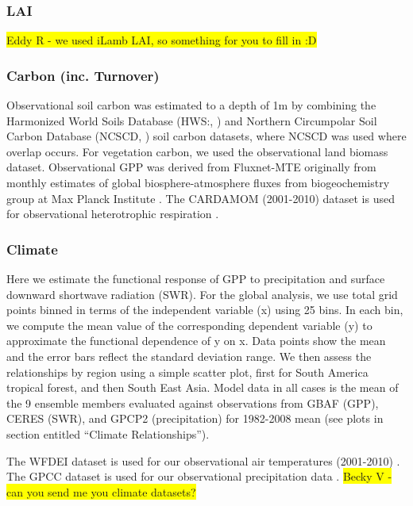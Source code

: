 \documentclass[bg, manuscript]{copernicus}
\newcommand{\hilight}[1]{\colorbox{yellow}{#1}}
\begin{document}
\subsubsection{LAI}
\hilight{Eddy R - we used iLamb LAI, so something for you to fill in :D}

\subsubsection{Carbon (inc. Turnover)}
Observational soil carbon was estimated to a depth of 1m by combining the Harmonized World Soils Database (HWS:, \cite{nachtergaele2012harmonized}) and Northern Circumpolar Soil Carbon Database (NCSCD, \cite{hugelius2013northern}) soil carbon datasets, where NCSCD was used where overlap occurs. For vegetation carbon, we used the \citep{avitabile2016integrated} observational land biomass dataset. Observational GPP was derived from Fluxnet-MTE originally from monthly estimates of global biosphere-atmosphere fluxes from biogeochemistry group at Max Planck Institute \citet{jung2010recent}. The CARDAMOM (2001-2010) dataset is used for observational heterotrophic respiration \citep{bloom2015cardamom}. 

\subsubsection{Climate}
Here we estimate the functional response of GPP to precipitation and surface downward shortwave radiation (SWR). For the global analysis, we use total grid points binned in terms of the independent variable (x) using 25 bins. In each bin, we compute the mean value of the corresponding dependent variable (y) to approximate the functional dependence of y on x. Data points show the mean and the error bars reﬂect the standard deviation range. We then assess the relationships by region using a simple scatter plot, first for South America tropical forest, and then South East Asia. Model data in all cases is the mean of the 9 ensemble members evaluated against observations from GBAF (GPP), CERES (SWR), and GPCP2 (precipitation) for 1982-2008 mean (see plots in section entitled “Climate Relationships”).

The WFDEI dataset is used for our observational air temperatures (2001-2010) \citep{weedon2014wfdei}. The GPCC dataset is used for our observational precipitation data \citep{schneider2011gpcc}.
\hilight{Becky V - can you send me you climate datasets?}
\end{document}
